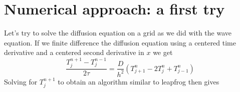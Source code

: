 \section*{Numerical approach: a first try}

Let\rq s try to solve the diffusion equation on a grid as we did with the wave equation.
If we finite difference the diffusion equation using a centered time derivative and
a centered second derivative in $x$ we get
\begin{equation}\label{eq:77}
\frac{T_{j}^{n+1}-T_{j}^{n-1}}{2 \tau}=\frac{D}{h^{2}}\left(T_{j+1}^{n}-2 T_{j}^{n}+T_{j-1}^{n}\right)
\end{equation}
Solving for $T_j^{n+1}$ to obtain an algorithm similar to leapfrog then gives

